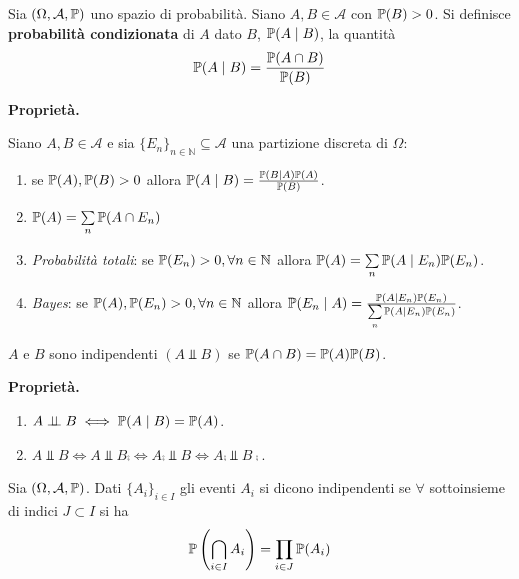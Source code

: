 
\ParteEsercizi


\begin{definition}
Sia $( \Omega ,\mathcal{A} ,\mathbb{P})$ uno spazio di probabilità. Siano $A,B\in \mathcal{A}$ con $\mathbb{P}( B)  >0$. Si definisce \textbf{probabilità condizionata} di $A$ dato $B$, $\mathbb{P}( A\mid B)$, la quantità
\begin{equation*}
\mathbb{P}( A\mid B) =\frac{\mathbb{P}( A\cap B)}{\mathbb{P}( B)}
\end{equation*}
\end{definition}
\textbf{Proprietà.}

Siano $A,B\in \mathcal{A}$ e sia $\{E_{n}\}_{n\in \mathbb{N}} \subseteq \mathcal{A}$ una partizione discreta di $\Omega $:
\begin{enumerate}
\item se $\mathbb{P}( A) ,\mathbb{P}( B)  >0$ allora $\mathbb{P}( A\mid B) =\frac{\mathbb{P}( B\mid A)\mathbb{P}( A)}{\mathbb{P}( B)}$.
\item $\mathbb{P}( A) =\sum\limits _{n}\mathbb{P}( A\cap E_{n})$
\item \textit{Probabilità totali}: se $\mathbb{P}( E_{n})  >0,\forall n\in \mathbb{N}$ allora $\mathbb{P}( A) =\sum\limits _{n}\mathbb{P}( A\mid E_{n})\mathbb{P}( E_{n})$.
\item \textit{Bayes}: se $\mathbb{P}( A) ,\mathbb{P}( E_{n})  >0,\forall n\in \mathbb{N}$ allora $\mathbb{P}( E_{n} \mid A) =\frac{\mathbb{P}( A\mid E_{n})\mathbb{P}( E_{n})}{\sum\limits _{n}\mathbb{P}( A\mid E_{n})\mathbb{P}( E_{n})}$.
\end{enumerate}
\begin{definition}
$A$ e $B$ sono indipendenti $( A\Bot B)$ se $\mathbb{P}( A\cap B) =\mathbb{P}( A)\mathbb{P}( B)$.
\end{definition}
\textbf{Proprietà.}
\begin{enumerate}
\item $A\perp \!\!\! \perp B\iff \mathbb{P}( A\mid B) =\mathbb{P}( A)$.
\item $A\Bot B\iff A\Bot B\comp \iff A\comp \Bot B\iff A\comp \Bot B\comp$.
\end{enumerate}
\begin{definition}
Sia $( \Omega ,\mathcal{A} ,\mathbb{P})$. Dati $\{A_{i}\}_{i\in I}$ gli eventi $A_{i}$ si dicono indipendenti se $\forall $ sottoinsieme di indici $J\subset I$ si ha
\begin{equation*}
\mathbb{P}\left(\bigcap _{i\in I} A_{i}\right) =\prod _{i\in J}\mathbb{P}( A_{i})
\end{equation*}
\end{definition}
\Esercizio{}


